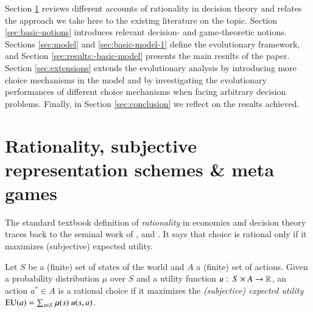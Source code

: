 \documentclass[fleqn,reqno,11pt]{article}
\begin{document}

Section \ref{sec:rati--subj} reviews different accounts of rationality in decision theory and
relates the approach we take here to the existing literature on the topic. Section
\ref{sec:basic-notions} introduces relevant decision- and game-theoretic notions. Sections
\ref{sec:model} and \ref{sec:basic-model-1} define the evolutionary framework, and Section
\ref{sec:results:-basic-model} presents the main results of the paper. Section
\ref{sec:extensions} extends the evolutionary analysis by introducing more choice mechanisms in
the model and by investigating the evolutionary performances of different choice mechanisms
when facing arbitrary decision problems. Finally, in Section \ref{sec:conclusion} we reflect on
the results achieved.



\section{Rationality, subjective representation schemes \& meta games}
\label{sec:rati--subj}

The standard textbook definition of \textit{rationality} in economics and decision theory
traces back to the seminal work of \citet{deFinetti37}, \citet{Neumannvon-NeumannMorgenstern1944:Theory-of-Games}
and \citet{Savage1954:The-Foundations}. It says that choice is rational only if it maximizes
(subjective) expected utility.

\begin{definition}
  \label{def:rationality}
  Let $S$ be a (finite) set of states of the world and $A$ a (finite) set of actions. Given a
  probability distribution $\mu$ over $S$ and a utility function
  $u \thinspace \colon \thinspace S \times A \rightarrow \mathbb{R} $, an action $a^* \in A$ is a rational choice
 if it maximizes the \emph{(subjective) expected utility} 
  $\EU(a) = \sum_{s \in S} \mu(s) \ u(s, a)$.
\end{definition}
\end{document}
